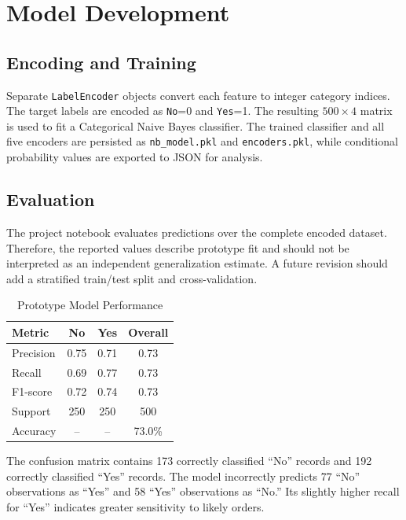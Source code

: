 \documentclass[conference]{IEEEtran}
\begin{document}
\section{Model Development}

\subsection{Encoding and Training}

Separate \texttt{LabelEncoder} objects convert each feature to integer category indices. The target labels are encoded as \texttt{No}=0 and \texttt{Yes}=1. The resulting $500\times4$ matrix is used to fit a Categorical Naive Bayes classifier. The trained classifier and all five encoders are persisted as \texttt{nb\_model.pkl} and \texttt{encoders.pkl}, while conditional probability values are exported to JSON for analysis.

\subsection{Evaluation}

The project notebook evaluates predictions over the complete encoded dataset. Therefore, the reported values describe prototype fit and should not be interpreted as an independent generalization estimate. A future revision should add a stratified train/test split and cross-validation.

\begin{table}[t]
\centering
\caption{Prototype Model Performance}
\label{tab:metrics}
\footnotesize
\begin{tabular}{lccc}
\toprule
\textbf{Metric} & \textbf{No} & \textbf{Yes} & \textbf{Overall}\\
\midrule
Precision & 0.75 & 0.71 & 0.73\\
Recall & 0.69 & 0.77 & 0.73\\
F1-score & 0.72 & 0.74 & 0.73\\
Support & 250 & 250 & 500\\
Accuracy & -- & -- & 73.0\%\\
\bottomrule
\end{tabular}
\end{table}

The confusion matrix contains 173 correctly classified ``No'' records and 192 correctly classified ``Yes'' records. The model incorrectly predicts 77 ``No'' observations as ``Yes'' and 58 ``Yes'' observations as ``No.'' Its slightly higher recall for ``Yes'' indicates greater sensitivity to likely orders.
\end{document}
